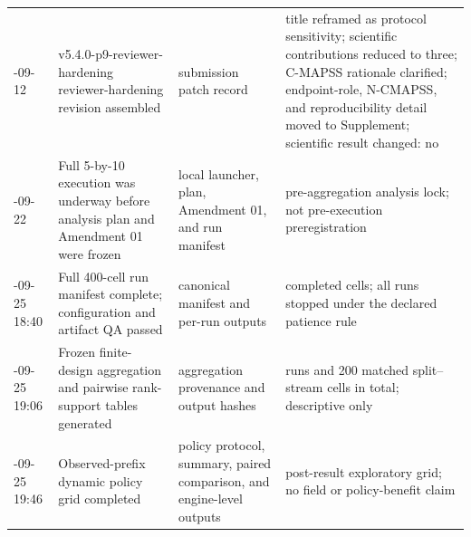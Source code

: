 \begin{longtable}{@{}>{\raggedright\arraybackslash}p{}>{\raggedright\arraybackslash}p{}>{\raggedright\arraybackslash}p{}>{\raggedright\arraybackslash}p{}@{}}
2026-09-12 & v5.4.0-p9-reviewer-hardening reviewer-hardening revision assembled & submission patch record & title reframed as protocol sensitivity; scientific contributions reduced to three; C-MAPSS rationale clarified; endpoint-role, N-CMAPSS, and reproducibility detail moved to Supplement; scientific result changed: no \\
2026-09-22 & Full 5-by-10 execution was underway before analysis plan and Amendment 01 were frozen & local launcher, plan, Amendment 01, and run manifest & pre-aggregation analysis lock; not pre-execution preregistration \\
2026-09-25 18:40 & Full 400-cell run manifest complete; configuration and artifact QA passed & canonical manifest and per-run outputs & 400 completed cells; all runs stopped under the declared patience rule \\
2026-09-25 19:06 & Frozen finite-design aggregation and pairwise rank-support tables generated & aggregation provenance and output hashes & 400 runs and 200 matched split--stream cells in total; descriptive only \\
2026-09-25 19:46 & Observed-prefix dynamic policy grid completed & policy protocol, summary, paired comparison, and engine-level outputs & post-result exploratory grid; no field or policy-benefit claim \\
\bottomrule
\end{longtable}

\normalsize
